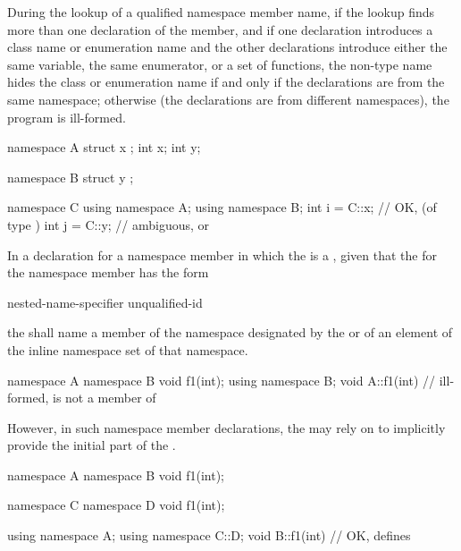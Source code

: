 \pnum
During the lookup of a qualified namespace member name, if the lookup
finds more than one declaration of the member, and if one declaration
introduces a class name or enumeration name and the other declarations
introduce either the same variable, the same enumerator, or a set of
functions, the non-type name hides the class or enumeration name if and
only if the declarations are from the same namespace; otherwise (the
declarations are from different namespaces), the program is ill-formed.
\begin{example}

\begin{codeblock}
namespace A {
  struct x { };
  int x;
  int y;
}

namespace B {
  struct y { };
}

namespace C {
  using namespace A;
  using namespace B;
  int i = C::x;     // OK,  (of type )
  int j = C::y;     // ambiguous,  or 
}
\end{codeblock}
\end{example}

\pnum
In a declaration for a namespace member in which the
 is a , given that the
 for the namespace member has the form

\begin{ncbnf}
nested-name-specifier unqualified-id
\end{ncbnf}

the
 shall name a member of the namespace
designated by the 
or of an element of the inline namespace set of that namespace.
\begin{example}

\begin{codeblock}
namespace A {
  namespace B {
    void f1(int);
  }
  using namespace B;
}
void A::f1(int){ }  // ill-formed,  is not a member of 
\end{codeblock}

\end{example} However, in such namespace member declarations, the
 may rely on 
to implicitly provide the initial part of the
. \begin{example}

\begin{codeblock}
namespace A {
  namespace B {
    void f1(int);
  }
}

namespace C {
  namespace D {
    void f1(int);
  }
}

using namespace A;
using namespace C::D;
void B::f1(int){ }  // OK, defines 
\end{codeblock}
\end{example}
%

